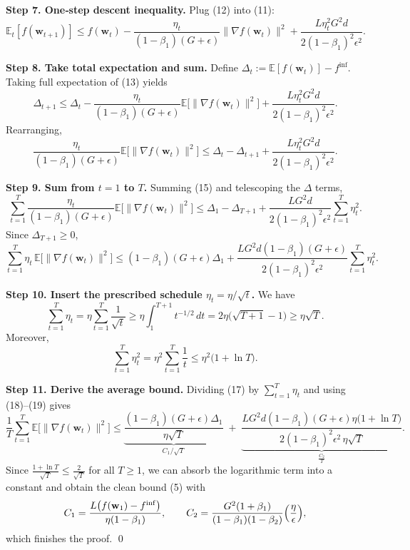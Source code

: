 \documentclass{article}
\begin{document}
\noindent\textbf{Step 7. One‑step descent inequality.}  
Plug (12) into (11):
\[
\mathbb{E}_t[f(\mathbf{w}_{t+1})]\le f(\mathbf{w}_t)
-\frac{\eta_t}{(1-\beta_1)(G+\epsilon)}\|\nabla f(\mathbf{w}_t)\|^2
+\frac{L\eta_t^{2}G^2 d}{2(1-\beta_1)^2\epsilon^2}.
\tag{13}
\]

\noindent\textbf{Step 8. Take total expectation and sum.}  
Define $\Delta_t:=\mathbb{E}[f(\mathbf{w}_t)]-f^{\inf}$. Taking full expectation of (13) yields
\[
\Delta_{t+1}\le\Delta_t
-\frac{\eta_t}{(1-\beta_1)(G+\epsilon)}\mathbb{E}\big[\|\nabla f(\mathbf{w}_t)\|^2\big]
+\frac{L\eta_t^{2}G^2 d}{2(1-\beta_1)^2\epsilon^2}.
\tag{14}
\]
Rearranging,
\[
\frac{\eta_t}{(1-\beta_1)(G+\epsilon)}\mathbb{E}\big[\|\nabla f(\mathbf{w}_t)\|^2\big]
\le \Delta_t-\Delta_{t+1}
+\frac{L\eta_t^{2}G^2 d}{2(1-\beta_1)^2\epsilon^2}.
\tag{15}
\]

\noindent\textbf{Step 9. Sum from $t=1$ to $T$.}  
Summing (15) and telescoping the $\Delta$ terms,
\[
\sum_{t=1}^{T}\frac{\eta_t}{(1-\beta_1)(G+\epsilon)}
\mathbb{E}\big[\|\nabla f(\mathbf{w}_t)\|^2\big]
\le \Delta_1-\Delta_{T+1}
+\frac{L G^2 d}{2(1-\beta_1)^2\epsilon^2}\sum_{t=1}^{T}\eta_t^{2}.
\tag{16}
\]
Since $\Delta_{T+1}\ge0$,
\[
\sum_{t=1}^{T}\eta_t\,
\mathbb{E}\big[\|\nabla f(\mathbf{w}_t)\|^2\big]
\le (1-\beta_1)(G+\epsilon)\Delta_1
+\frac{L G^2 d (1-\beta_1)(G+\epsilon)}{2(1-\beta_1)^2\epsilon^2}\sum_{t=1}^{T}\eta_t^{2}.
\tag{17}
\]

\noindent\textbf{Step 10. Insert the prescribed schedule $\eta_t=\eta/\sqrt{t}$.}  
We have
\[
\sum_{t=1}^{T}\eta_t = \eta\sum_{t=1}^{T}\frac{1}{\sqrt{t}}
\ge \eta\int_{1}^{T+1}t^{-1/2}\,dt
=2\eta\big(\sqrt{T+1}-1\big)\ge \eta\sqrt{T}.
\tag{18}
\]
Moreover,
\[
\sum_{t=1}^{T}\eta_t^{2}= \eta^{2}\sum_{t=1}^{T}\frac{1}{t}
\le \eta^{2}\big(1+\ln T\big).
\tag{19}
\]

\noindent\textbf{Step 11. Derive the average bound.}  
Dividing (17) by $\sum_{t=1}^{T}\eta_t$ and using (18)–(19) gives
\[
\frac{1}{T}\sum_{t=1}^{T}\mathbb{E}\big[\|\nabla f(\mathbf{w}_t)\|^2\big]
\le
\underbrace{\frac{(1-\beta_1)(G+\epsilon)\Delta_1}{\eta\sqrt{T}}}_{C_1/\sqrt{T}}
\;+\;
\underbrace{\frac{L G^2 d (1-\beta_1)(G+\epsilon)\eta\big(1+\ln T\big)}{2(1-\beta_1)^2\epsilon^2\,\eta\sqrt{T}}}_{\displaystyle\frac{C_2}{T}} .
\]
Since $\frac{1+\ln T}{\sqrt{T}}\le \frac{2}{\sqrt{T}}$ for all $T\ge 1$, we can absorb the logarithmic term into a constant and obtain the clean bound (5) with
\[
C_1=\frac{L\big(f(\mathbf{w}_1)-f^{\inf}\big)}{\eta(1-\beta_1)},
\qquad
C_2=\frac{G^2(1+\beta_1)}{(1-\beta_1)(1-\beta_2)}\Bigl(\frac{\eta}{\epsilon}\Bigr),
\]
which finishes the proof. \qed
\end{document}
